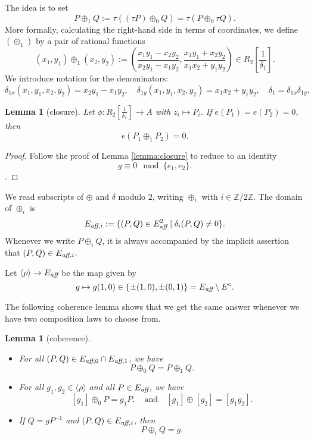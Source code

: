 \documentclass[12pt]{article}
\newtheorem{lemma}[theorem]{Lemma}
\newcommand{\ring}[1]{\mathbb{#1}}
\newcommand{\op}[1]{\hbox{#1}}
\newcommand{\f}[1]{\frac{1}{#1}}
\newcommand{\Eaff}{E_{\op{\scriptsize\it aff}}}
\newcommand{\Eaf}[1]{E_{\op{\scriptsize\it aff},{#1}}}
\newcommand{\Eoo}{E^{\circ}}
\newcommand{\ang}[1]{\langle{#1}\rangle}
\def\cong{\equiv}
\begin{document}
The idea is to
set 
\begin{equation}\label{eqn:tauplus}
P\oplus_1 Q := \tau((\tau P)\oplus_0 Q) = \tau(P\oplus_0 \tau Q).
\end{equation}
More formally, calculating the right-hand side in terms of
coordinates, we define $(\oplus_1)$ by a pair of rational functions
\[
(x_1,y_1)\oplus_1 (x_2,y_2) := \left(\frac{x_1y_1 - x_2 y_2}{x_2
    y_1-x_1 y_2},\frac{x_1 y_1 + x_2 y_2}{x_1 x_2 + y_1 y_2}\right) 
    \in R_2[\f{\delta_1}].
\]
We introduce notation for the denominators:
\[
\delta_{1x}(x_1,y_1,x_2,y_2) = x_2 y_1 - x_1 y_2,
\quad \delta_{1y}(x_1,y_1,x_2,y_2)= x_1 x_2 + y_1 y_2,
\quad \delta_1 = \delta_{1x} \delta_{1y}.
\] 
\smallskip


\begin{lemma}[closure]
  Let $\phi:R_2[\f{\delta_1}]\to A$ with $z_i\mapsto P_i$.  If
  $e(P_1)=e(P_2)=0$, then
  \[
  e(P_1\oplus_1 P_2) = 0.
  \]
\end{lemma}

\begin{proof} Follow the proof of Lemma \ref{lemma:closure} to reduce
  to an identity
\[
g\cong 0 \mod \{e_1,e_2\}.
\].
\end{proof}


We read subscripts of $\oplus$ and $\delta$
modulo $2$, writing $\oplus_i$ with $i\in\ring{Z}/2\ring{Z}$.
The domain of $\oplus_i$ is
\[
\Eaf{i} := \{(P,Q)\in \Eaff^2\mid \delta_i(P,Q)\ne0\}.
\]
Whenever we write $P\oplus_i Q$, it is always accompanied by
the implicit assertion that 
$(P,Q)\in \Eaf{i}$.

Let $\ang{\rho}\to \Eaff$ be the map given by 
\[
g\mapsto g(1,0)\in\{\pm (1,0),\pm (0,1)\} = \Eaff\setminus \Eoo.
\]

The following coherence lemma shows that we get the same answer
whenever we have two composition laws to choose from.

\begin{lemma}[coherence] \label{lemma:extend} 
\par
\noindent
\begin{itemize}
\item For all $(P,Q)\in \Eaf0 \cap \Eaf1$, we have
\[
P \oplus_0 Q = P\oplus_1 Q.
\]
\item
For all $g_1,g_2\in \ang{\rho}$ and all $P\in \Eaff$, we have
\[
[g_1]\oplus_0 P = g_1 P,\quad\text{and}\quad [g_1]\oplus[g_2]=[g_1 g_2].
\]
\item If $Q = g P^{-1}$ and $(P,Q)\in \Eaf{i}$, then
\[
P\oplus_i Q = g.
\]
\end{itemize}
\end{lemma}
\end{document}
